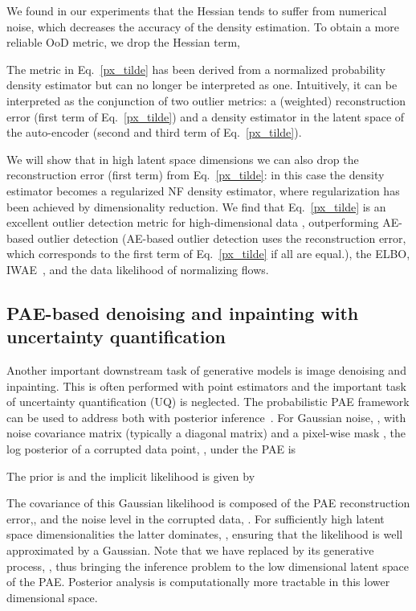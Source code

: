 \documentclass{article}
\begin{document}
We found in our experiments that the Hessian tends to suffer from numerical noise, which decreases the accuracy of the density estimation.
To obtain a more reliable OoD metric, we drop the Hessian term,

The metric in Eq.~\ref{px_tilde} has been derived from a normalized probability density estimator but can no longer be interpreted as one. Intuitively, it can be interpreted as the conjunction of two outlier metrics: a (weighted) reconstruction error (first term of Eq.~\ref{px_tilde}) and a density estimator in the latent space of the auto-encoder (second and third term of Eq.~\ref{px_tilde}).

We will show that in high latent space dimensions we can also drop the 
reconstruction error (first term) from Eq.~\ref{px_tilde}: in this case the density estimator becomes a regularized NF density estimator, where regularization has been achieved by dimensionality reduction. 
We find that Eq.~\ref{px_tilde} is an excellent outlier detection metric for high-dimensional data , outperforming AE-based outlier detection (AE-based outlier detection uses the reconstruction error, which corresponds to the first term of Eq.~\ref{px_tilde} if all  are equal.), the ELBO, IWAE~\citep{IWAE}, and the data likelihood of normalizing flows. 

\subsection{PAE-based denoising and inpainting with uncertainty quantification}
\label{sec:recon}
Another important downstream task of generative models is image denoising and inpainting. This is often performed with point estimators and the important task of uncertainty quantification (UQ) is neglected. The probabilistic PAE framework can be used to address both with posterior inference~\citep{DeepUQ}. 
For Gaussian noise, , with noise 
covariance matrix 
(typically a diagonal matrix) and a pixel-wise mask , the log posterior of a corrupted data point, , under the PAE is

The prior is  and the implicit likelihood is given by

The covariance of this Gaussian likelihood is composed of the PAE reconstruction error,, and the noise level in the corrupted data, . For sufficiently high latent space dimensionalities the latter dominates, , ensuring that the likelihood is well approximated by a Gaussian. Note that we have replaced  by its generative process, , thus bringing the inference problem to the low dimensional latent space of the PAE. Posterior analysis is computationally more tractable in this lower dimensional space.
\end{document}
